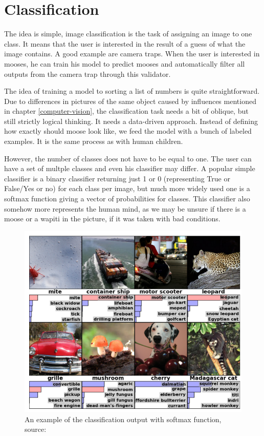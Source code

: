 \section{Classification}
\label{classification}

The idea is simple, image classification is the task of assigning an image to 
one class. It means that the user is interested in the result of a guess of what 
the image contains. A good example are camera traps. When the user is interested 
in mooses, he can train his model to predict mooses and automatically filter all 
outputs from the camera trap through this validator.

The idea of training a model to sorting a list of numbers is quite 
straightforward. Due to differences in pictures of the same object caused by 
influences mentioned in chapter \ref{computer-vision}, the classification task 
needs a bit of oblique, but still strictly logical thinking. It needs a 
data-driven approach. Instead of defining how exactly should moose look like, we 
feed the model with a bunch of labeled examples. It is the same process as with 
human children.

However, the number of classes does not have to be equal to one. The user can 
have a set of multple classes and even his classifier may differ. A popular 
simple classifier is a binary classifier returning just 1 or 0 (representing 
True or False/Yes or no) for each class per image, but much more widely used one 
is a softmax function giving a vector of probabilities for classes. This 
classifier also somehow more represents the human mind, as we may be unsure if 
there is a moose or a wapiti in the picture, if it was taken with bad 
conditions.

\begin{figure}[H]
   \centering
	\includegraphics[width=.8\linewidth]{./pictures/classification.png}
	\caption[Classification example]{An example of the classification output with 
softmax function, source: \cite{cnn-classification}}
      \label{fig:class}
\end{figure}

